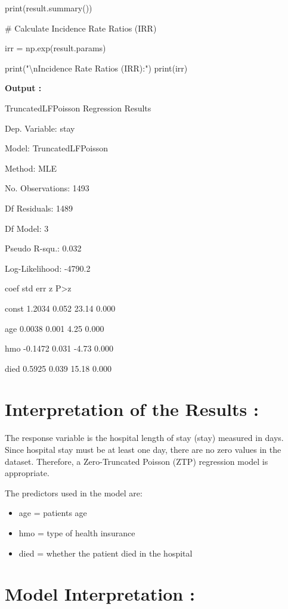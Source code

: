 \documentclass[
]{article}
\begin{document}
print(result.summary())

\# Calculate Incidence Rate Ratios (IRR)

irr = np.exp(result.params)

print("\textbackslash nIncidence Rate Ratios (IRR):") print(irr)

\textbf{Output :}

TruncatedLFPoisson Regression Results

Dep. Variable: stay

Model: TruncatedLFPoisson

Method: MLE

No. Observations: 1493

Df Residuals: 1489

Df Model: 3

Pseudo R-squ.: 0.032

Log-Likelihood: -4790.2

coef std err z P\textgreater\textbar z\textbar{}

const 1.2034 0.052 23.14 0.000

age 0.0038 0.001 4.25 0.000

hmo -0.1472 0.031 -4.73 0.000

died 0.5925 0.039 15.18 0.000

\section{\texorpdfstring{\textbf{Interpretation of the Results
:}}{Interpretation of the Results :}}\label{interpretation-of-the-results}

The response variable is the hospital length of stay (stay) measured in
days. Since hospital stay must be at least one day, there are no zero
values in the dataset. Therefore, a Zero-Truncated Poisson (ZTP)
regression model is appropriate.

The predictors used in the model are:

\begin{itemize}
\item
  age = patient\textquotesingle s age
\item
  hmo = type of health insurance
\item
  died = whether the patient died in the hospital
\end{itemize}

\section{\texorpdfstring{\textbf{Model Interpretation
:}}{Model Interpretation :}}\label{model-interpretation}
\end{document}
